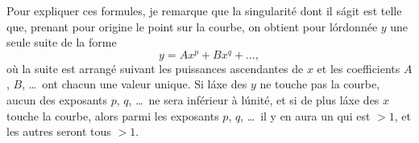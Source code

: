 \documentclass[11pt,a4paper]{article}
\theoremstyle{plain}
\begin{document}
Pour expliquer ces formules, je remarque que la singularit\'e dont il s\'agit est telle que, prenant pour origine le point sur la courbe, on obtient pour l\'ordonn\'ee $y$ une seule suite de la forme
\[
y = Ax^p + Bx^q + \ldots,
\]
o\`u la suite est arrang\'e suivant les puissances ascendantes de $x$ et les coefficients $A$, $B$, \ldots\ ont chacun une valeur unique. Si l\'axe des $y$ ne touche pas la courbe, aucun des exposants $p$, $q$, \ldots\ ne sera inf\'erieur \`a l\'unit\'e, et si de plus l\'axe des $x$ touche la courbe, alors parmi les exposants $p$, $q$, \ldots\ il y en aura un qui est $> 1$, et les autres seront tous $> 1$.

\end{document}
